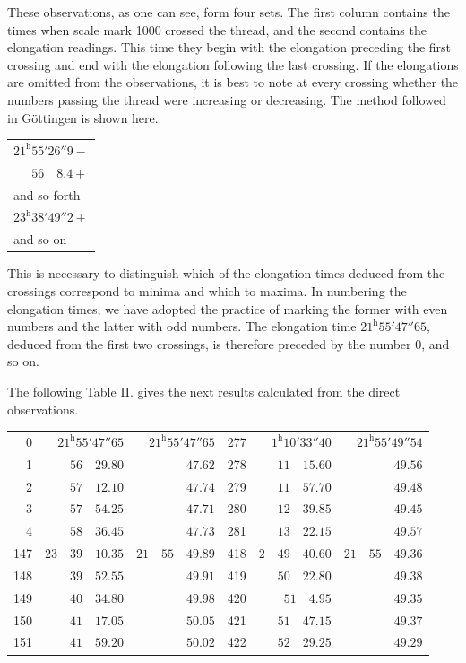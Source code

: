 These observations, as one can see, form four sets. The first column contains the times when scale mark 1000 crossed the thread, and the second contains the elongation readings. This time they begin with the elongation preceding the first crossing and end with the elongation following the last crossing. If the elongations are omitted from the observations, it is best to note at every crossing whether the numbers passing the thread were increasing or decreasing. The method followed in Göttingen is shown here.
\begin{center}
\begin{tabular}{l}
$21^{\mathrm{h}}55'26''9-$ \\
$\phantom{21^{\mathrm{h}}}56\quad8.4+$ \\
and so forth \\
$23^{\mathrm{h}}38'49''2+$ \\
and so on
\end{tabular}
\end{center}

This is necessary to distinguish which of the elongation times deduced from the crossings correspond to minima and which to maxima. In numbering the elongation times, we have adopted the practice of marking the former with even numbers and the latter with odd numbers. The elongation time $21^{\mathrm{h}}55'47''65$, deduced from the first two crossings, is therefore preceded by the number 0, and so on.

The following Table II. gives the next results calculated from the direct observations.
\begin{center}
\begingroup\fontsize{9}{11}\selectfont\setlength{\tabcolsep}{4pt}
\begin{tabular}{r|r|r||r|r|r}
0 & $21^{\mathrm{h}}55'47''65$ & $21^{\mathrm{h}}55'47''65$ & 277 & $1^{\mathrm{h}}10'33''40$ & $21^{\mathrm{h}}55'49''54$ \\
1 & $56\quad29.80$ & $47.62$ & 278 & $11\quad15.60$ & $49.56$ \\
2 & $57\quad12.10$ & $47.74$ & 279 & $11\quad57.70$ & $49.48$ \\
3 & $57\quad54.25$ & $47.71$ & 280 & $12\quad39.85$ & $49.45$ \\
4 & $58\quad36.45$ & $47.73$ & 281 & $13\quad22.15$ & $49.57$ \\[7pt]
147 & $23\quad39\quad10.35$ & $21\quad55\quad49.89$ & 418 & $2\quad49\quad40.60$ & $21\quad55\quad49.36$ \\
148 & $39\quad52.55$ & $49.91$ & 419 & $50\quad22.80$ & $49.38$ \\
149 & $40\quad34.80$ & $49.98$ & 420 & $51\quad4.95$ & $49.35$ \\
150 & $41\quad17.05$ & $50.05$ & 421 & $51\quad47.15$ & $49.37$ \\
151 & $41\quad59.20$ & $50.02$ & 422 & $52\quad29.25$ & $49.29$
\end{tabular}\endgroup
\end{center}

